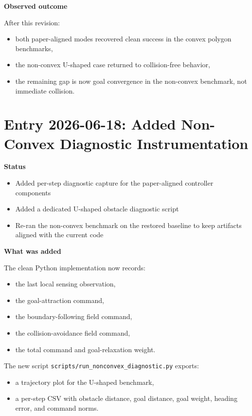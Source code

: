 \documentclass[11pt]{article}
\begin{document}
\textbf{Observed outcome}

After this revision:

\begin{itemize}[leftmargin=*]
  \item both paper-aligned modes recovered clean success in the convex polygon benchmarks,
  \item the non-convex U-shaped case returned to collision-free behavior,
  \item the remaining gap is now goal convergence in the non-convex benchmark, not immediate collision.
\end{itemize}

\section*{Entry 2026-06-18: Added Non-Convex Diagnostic Instrumentation}

\textbf{Status}

\begin{itemize}[leftmargin=*]
  \item Added per-step diagnostic capture for the paper-aligned controller components
  \item Added a dedicated U-shaped obstacle diagnostic script
  \item Re-ran the non-convex benchmark on the restored baseline to keep artifacts aligned with the current code
\end{itemize}

\textbf{What was added}

The clean Python implementation now records:

\begin{itemize}[leftmargin=*]
  \item the last local sensing observation,
  \item the goal-attraction command,
  \item the boundary-following field command,
  \item the collision-avoidance field command,
  \item the total command and goal-relaxation weight.
\end{itemize}

The new script \texttt{scripts/run\_nonconvex\_diagnostic.py} exports:

\begin{itemize}[leftmargin=*]
  \item a trajectory plot for the U-shaped benchmark,
  \item a per-step CSV with obstacle distance, goal distance, goal weight,
  heading error, and command norms.
\end{itemize}
\end{document}
